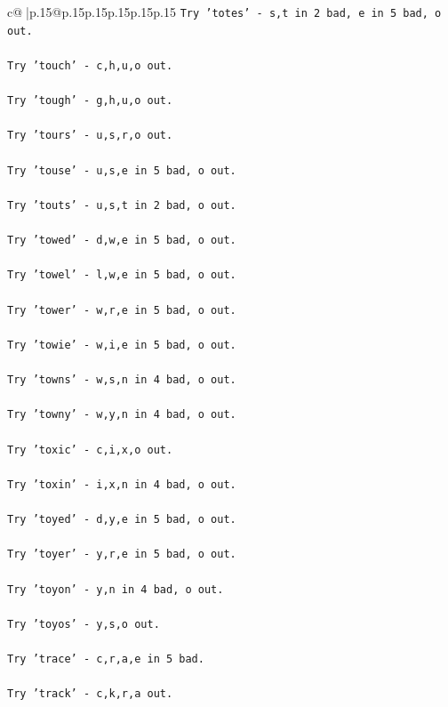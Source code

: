 \documentclass{article}
\begin{document}
{\begin{supertabular}{c@{$\;$}|p{.15\linewidth}@{}p{.15\linewidth}p{.15\linewidth}p{.15\linewidth}p{.15\linewidth}p{.15\linewidth}}
{{{\texttt{Try 'totes' {-} s,t in 2 bad, e in 5 bad, o out.} \\
\\ 
\texttt{Try 'touch' {-} c,h,u,o out.} \\
\\ 
\texttt{Try 'tough' {-} g,h,u,o out.} \\
\\ 
\texttt{Try 'tours' {-} u,s,r,o out.} \\
\\ 
\texttt{Try 'touse' {-} u,s,e in 5 bad, o out.} \\
\\ 
\texttt{Try 'touts' {-} u,s,t in 2 bad, o out.} \\
\\ 
\texttt{Try 'towed' {-} d,w,e in 5 bad, o out.} \\
\\ 
\texttt{Try 'towel' {-} l,w,e in 5 bad, o out.} \\
\\ 
\texttt{Try 'tower' {-} w,r,e in 5 bad, o out.} \\
\\ 
\texttt{Try 'towie' {-} w,i,e in 5 bad, o out.} \\
\\ 
\texttt{Try 'towns' {-} w,s,n in 4 bad, o out.} \\
\\ 
\texttt{Try 'towny' {-} w,y,n in 4 bad, o out.} \\
\\ 
\texttt{Try 'toxic' {-} c,i,x,o out.} \\
\\ 
\texttt{Try 'toxin' {-} i,x,n in 4 bad, o out.} \\
\\ 
\texttt{Try 'toyed' {-} d,y,e in 5 bad, o out.} \\
\\ 
\texttt{Try 'toyer' {-} y,r,e in 5 bad, o out.} \\
\\ 
\texttt{Try 'toyon' {-} y,n in 4 bad, o out.} \\
\\ 
\texttt{Try 'toyos' {-} y,s,o out.} \\
\\ 
\texttt{Try 'trace' {-} c,r,a,e in 5 bad.} \\
\\ 
\texttt{Try 'track' {-} c,k,r,a out.} \\
\\ 
}}}
\end{supertabular}}
\end{document}
